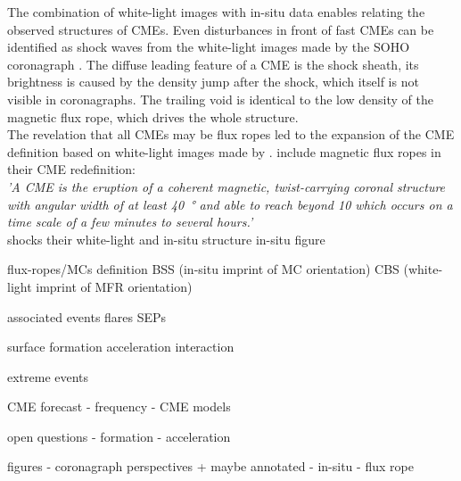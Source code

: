 The combination of white-light images with in-situ data enables relating the observed structures of CMEs. Even disturbances in front of fast CMEs can be identified as shock waves from the white-light images made by the SOHO coronagraph \citep{Sheeley2000}. The diffuse leading feature of a CME is the shock sheath, its brightness is caused by the density jump after the shock, which itself is not visible in coronagraphs. The trailing void is identical to the low density of the magnetic flux rope, which drives the whole structure.\\

The revelation that all CMEs may be flux ropes \citep{Vourlidas2013,Marubashi2015} led to the expansion of the CME definition based on white-light images made by \citet{Hundhausen1984}. \citet{Vourlidas2013,Vourlidas2014} include magnetic flux ropes in their CME redefinition:\\
\textit{'A CME is the eruption of a coherent magnetic, twist-carrying coronal structure with angular width of at least \SI{40}{\degree} and able to reach beyond \SI{10}{\Rs} which occurs on a time scale of a few minutes to several hours.'}\\







shocks
their white-light and in-situ structure
in-situ figure

flux-ropes/MCs
definition
BSS (in-situ imprint of MC orientation)
CBS (white-light imprint of MFR orientation)


associated events
flares
SEPs

surface formation
acceleration
interaction



extreme events

CME forecast
- frequency
- CME models

open questions
- formation
- acceleration


figures
- coronagraph perspectives + maybe annotated
- in-situ
- flux rope

